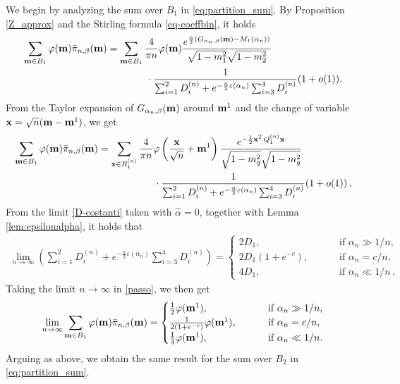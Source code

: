 \documentclass[11pt,oneside]{amsart}
\numberwithin{equation}{section}  %
\theoremstyle{plain}
\theoremstyle{remark}
\def \bm {{\bf m}}
\begin{document}
We begin by analyzing the sum over $B_1$ in \eqref{eq:partition_sum}. By Proposition \ref{Z_approx} and the Stirling formula
\eqref{eq-coeffbin}, it holds
\begin{align*}
    \sum_{\bm \in B_1} \varphi(\bm) \bar{\pi}_{n,\beta}(\bm)&
    =\sum_{\bm \in B_1} \frac{4}{\pi n} \varphi(\bm)\frac{e^{ \frac{n}{2} (G_{\alpha_n,\beta}(\bm)-M_1(\alpha_n))}}{\sqrt{1-m_1^2}\sqrt{1-m_2^2}} \\
& \qquad\qquad \cdot   \frac{1}{ \sum_{i=1}^2 D_i^{(n)}+e^{-\frac{n}{2} \varepsilon(\alpha_n)} \sum_{i=3}^4 D_i^{(n)} } (1+o(1)).
    \end{align*}
From the Taylor expansion of $G_{\alpha_n,\beta}(\bm)$ around $\bm^1$ and the change of variable ${\bf x}=\sqrt{n} (\bm-\bm^1)$, we get
\begin{equation}\label{passo}
\begin{split}
    \sum_{\bm \in B_1} \varphi(\bm) \bar{\pi}_{n,\beta}(\bm)
    &=
    \sum_{\textbf{x} \in R_1^{(n)}} \frac{4}{\pi n}\varphi \left (\frac{{\bf x}}{\sqrt{n}}+\bm^1 \right )
    \frac{e^{-\frac{1}{2}{\bf x}^TQ_1^{(n)}{\bf x} }}{\sqrt{1- m_g^2} \sqrt{1- m_g^2}}\\
    &\hspace{2cm}\cdot \frac{1}{\sum_{i=1}^2 D_i^{(n)}+e^{-\frac{n}{2} \varepsilon(\alpha_n)} \sum_{i=3}^4 D_i^{(n)}}
     (1+o(1))\,,
\end{split}
\end{equation}
%
From the limit \eqref{D-costanti} taken with $\hat\alpha=0$,  together with Lemma \ref{lem:epsilonalpha}, 
it holds that
\begin{align}\label{eq:limitD}
   \lim_{n \to \infty} \left ( \sum_{i=1}^2 D_i^{(n)}+e^{-\frac{n}{2} \varepsilon(\alpha_n)} \sum_{i=3}^4 D_i^{(n)} \right )=
   \begin{cases}
   2D_1,\qquad & \text{ if } \alpha_n \gg 1/n, \\
   2D_1(1+e^{-c}), \qquad & \text{ if } \alpha_n=c/n,\\
     4D_1, \qquad & \text{ if } \alpha_n \ll 1/n\,.
\end{cases}
\end{align}
Taking the limit $n\to\infty$ in \eqref{passo}, we then get
\begin{align*}
      \lim_{n \to \infty} \sum_{\bm \in B_1} \varphi(\bm) \bar{\pi}_{n,\beta}(\bm)=
      \begin{cases}
          \frac{1}{2} \varphi(\bm^1),  & \qquad \text{ if } \alpha_n \gg 1/n, \\
          \frac{1}{2(1+e^{-c})} \varphi(\bm^1),  & \qquad \text{ if } \alpha_n = c/n,\\
          \frac{1}{4} \varphi(\bm^1),  & \qquad \text{ if } \alpha_n \ll 1/n.
      \end{cases}
\end{align*}
Arguing as above, we obtain the same result for the sum over $B_2$ in \eqref{eq:partition_sum}.
\end{document}
